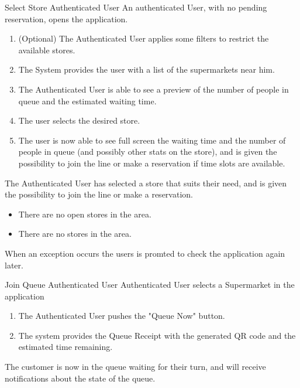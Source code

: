 \usecase
{Select Store}
{Authenticated User}
{An authenticated User, with no pending reservation, opens the application.}
{
        \begin{enumerate}
            \item (Optional) The Authenticated User applies some filters to restrict the available stores.  
            \item The System provides the user with a list of the supermarkets near him.
            \item The Authenticated User is able to see a preview of the number of people in queue and the estimated waiting time. 
            \item The user selects the desired store. 
            \item The user is now able to see full screen the waiting time and the number of people in queue (and possibly other stats on the store), and is given the possibility to join the line or make a reservation if time slots are available.  
        \end{enumerate}
}
{
    The Authenticated User has selected a store that suits their need, and is given the possibility to join the line or make a reservation. 
}
{
    \begin{itemize}
        \item There are no open stores in the area. 
        \item There are no stores in the area. 
    \end{itemize}
}
{
    When an exception occurs the users is promted to check the application again later. 
}

\usecase
{Join Queue}
{Authenticated User}
{Authenticated User selects a Supermarket in the application}
{
        \begin{enumerate}
            \item The Authenticated User pushes the "Queue Now" button.
            \item The system provides the Queue Receipt with the generated QR code and the estimated time remaining.
        \end{enumerate}
}
{
    The customer is now in the queue waiting for their turn, and will receive notifications about the state of the queue.
}
{}
{}


